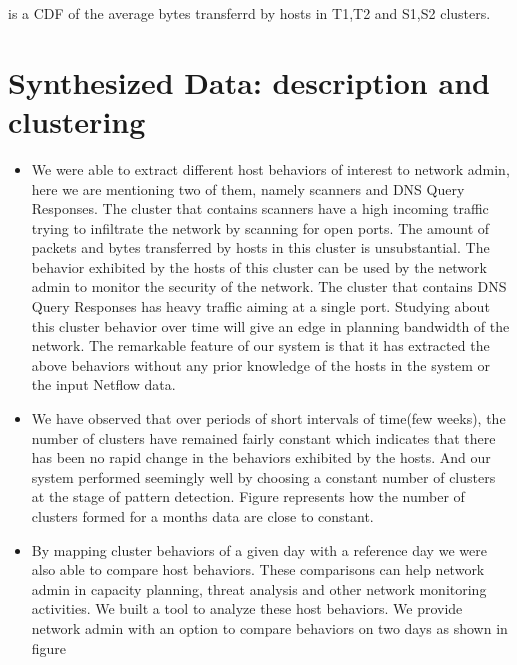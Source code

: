  is a CDF of the average bytes transferrd by hosts in T1,T2 and S1,S2 clusters. 

\section{Synthesized Data: description and clustering}


\begin{itemize}
\item We were able to extract different host behaviors of interest to network admin, here we are mentioning two of them, namely scanners and DNS Query Responses. The cluster that contains scanners have a high incoming traffic trying to infiltrate the
network by scanning for open ports. The amount of packets and bytes transferred by hosts in this cluster is unsubstantial. The behavior exhibited by the hosts of this
cluster can be used by the network admin to monitor the security of the network.
The cluster that contains DNS Query Responses has heavy traffic aiming at a single
port. Studying about this cluster behavior over time will give an edge in planning
bandwidth of the network. The remarkable feature of our system is that it has extracted
the above behaviors without any prior knowledge of the hosts in the system or the input Netflow data.
\item We have observed that over periods of short intervals of time(few weeks), the number
of clusters have remained fairly constant which indicates that there has been no
rapid change in the behaviors exhibited by the hosts. And our system performed
seemingly well by choosing a constant number of clusters at the stage of pattern
detection. Figure  represents how the number of clusters formed for a months
data are close to constant.



\item  By mapping cluster behaviors of a given day with a reference day we were also able
to compare host behaviors. These comparisons can help network admin in capacity
planning, threat analysis and other network monitoring activities. We built a tool to analyze these host behaviors. 
We provide network admin with an option to compare
behaviors on two days as shown in figure 


\end{itemize}

 

